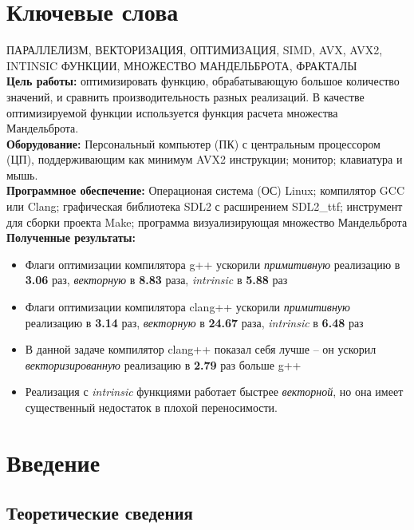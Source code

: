 \documentclass[a4paper, 12pt]{article}
\begin{document}



\section*{Ключевые слова}
\noindent \MakeUppercase{параллелизм, векторизация, оптимизация, SIMD, AVX, AVX2, intinsic функции, множество мандельброта, фракталы}\\

\textbf{Цель работы:} оптимизировать функцию, обрабатывающую большое количество значений, и сравнить производительность разных реализаций. В качестве оптимизируемой функции используется функция расчета множества Мандельброта. \\

\textbf{Оборудование:} Персональный компьютер (ПК) с центральным процессором (ЦП), поддерживающим как минимум AVX2 инструкции; монитор; клавиатура и мышь. \\

\textbf{Программное обеспечение:} Операционая система (ОС) Linux; компилятор GCC или Clang; графическая библиотека SDL2 с расширением SDL2\_ttf; инструмент для сборки проекта Make; программа визуализирующая множество Мандельброта\\

\textbf{Полученные результаты:} 
\begin{itemize}
    \item Флаги оптимизации компилятора g++ ускорили \textit{примитивную} реализацию в \textbf{3.06} раз, \textit{векторную} в \textbf{8.83} раза, \textit{intrinsic} в \textbf{5.88} раз
    \item Флаги оптимизации компилятора clang++ ускорили \textit{примитивную} реализацию в \textbf{3.14} раз, 
    \textit{векторную} в \textbf{24.67} раза, \textit{intrinsic} в \textbf{6.48} раз
    \item В данной задаче компилятор clang++ показал себя лучше -- он ускорил \textit{векторизированную} реализацию в \textbf{2.79} раз больше g++
    \item Реализация с \textit{intrinsic} функциями работает быстрее \textit{векторной}, но она имеет существенный недостаток в плохой переносимости.
\end{itemize}
\newpage

\section*{Введение}
\subsection*{Теоретические сведения}
\end{document}
